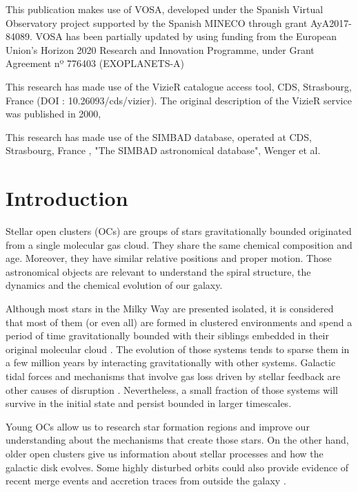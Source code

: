 \documentclass[11pt, a4paper, english]{book}
\begin{document}
\medskip

This publication makes use of VOSA, developed under the Spanish Virtual Observatory project
supported by the Spanish MINECO through grant AyA2017-84089.
VOSA has been partially updated by using funding from the European Union's Horizon 2020 Research
and Innovation Programme, under Grant Agreement nº 776403 (EXOPLANETS-A)

\medskip

This research has made use of the VizieR catalogue access tool, CDS, Strasbourg, France (DOI : 10.26093/cds/vizier).
The original description of the VizieR service was published in 2000, \cite[A\&AS 143, 23]{ochsenbein2000vizier}

\medskip

This research has made use of the SIMBAD database, operated at CDS, Strasbourg, France
\cite[2000,A\&AS,143,9]{wenger2000simbad}, "The SIMBAD astronomical database", Wenger et al.

\mainmatter
\chapter{Introduction}

Stellar open clusters (OCs) \cite{janes1982open} are groups of stars gravitationally bounded originated from a single molecular gas cloud.
They share the same chemical composition and age. Moreover, they have similar relative positions and proper motion.
Those astronomical objects are relevant to understand the spiral structure, the dynamics and the chemical evolution of our galaxy.

Although most stars in the Milky Way are presented isolated, it is considered that most of them (or even all)
are formed in clustered environments and spend a period of time gravitationally bounded with their siblings embedded
in their original molecular cloud \cite{clarke2000theformationofstellarclusters} \cite{portegies2010young}.
The evolution of those systems tends to sparse them in a few million years by interacting gravitationally with other systems.
Galactic tidal forces and mechanisms that involve gas loss driven by stellar feedback are other causes of disruption
\cite{brinkmann2017bound}.
Nevertheless, a small fraction of those systems will survive in the initial state and persist bounded in larger timescales.

Young OCs allow us to research star formation regions and improve our understanding about the mechanisms that create those stars.
On the other hand, older open clusters give us information about stellar processes and how the galactic disk evolves.
Some highly disturbed orbits could also provide evidence of recent merge events and accretion traces from outside the galaxy
\cite{cantat2016abundances}.
\end{document}

